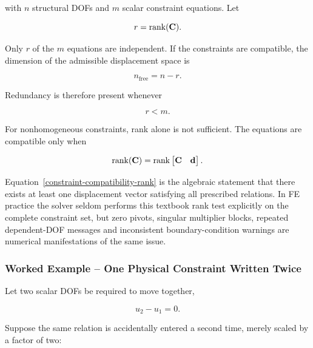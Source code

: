 with $n$ structural DOFs and $m$ scalar constraint equations. Let

\begin{equation}
    r=\operatorname{rank}(\mathbf{C}).
\end{equation}

Only $r$ of the $m$ equations are independent. If the constraints are
compatible, the dimension of the admissible displacement space is

\begin{equation}\label{constraint-nullity}
    n_{\mathrm{free}}=n-r.
\end{equation}

Redundancy is therefore present whenever

\begin{equation}
    r<m.
\end{equation}

For nonhomogeneous constraints, rank alone is not sufficient. The equations are
compatible only when

\begin{equation}\label{constraint-compatibility-rank}
    \operatorname{rank}(\mathbf{C})
    =
    \operatorname{rank}
    \begin{bmatrix}
        \mathbf{C} & \mathbf{d}
    \end{bmatrix}.
\end{equation}

Equation~\eqref{constraint-compatibility-rank} is the algebraic statement that
there exists at least one displacement vector satisfying all prescribed
relations. In FE practice the solver seldom performs this textbook rank test
explicitly on the complete constraint set, but zero pivots, singular multiplier
blocks, repeated dependent-DOF messages and inconsistent boundary-condition
warnings are numerical manifestations of the same issue.

\subsubsection{Worked Example -- One Physical Constraint Written Twice}

Let two scalar DOFs be required to move together,

\begin{equation}
    u_2-u_1=0.
\end{equation}

Suppose the same relation is accidentally entered a second time, merely scaled
by a factor of two:

